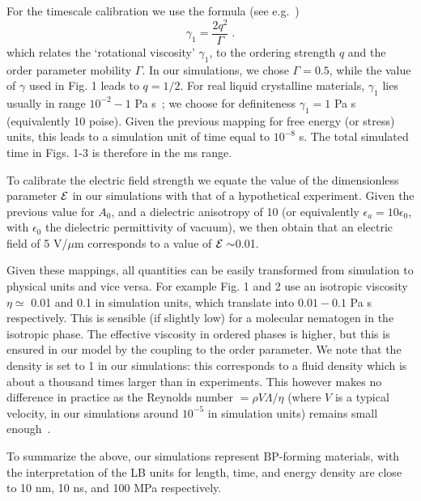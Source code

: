 \documentclass[12pt,twoside]{article}
\begin{document}
For the timescale calibration we use the formula (see e.g.~\cite{denniston1})
\begin{equation}
\gamma_1=\frac{2q^2}{\Gamma}\;.
\end{equation}
 which relates the `rotational viscosity' $\gamma_1$, to the ordering strength $q$ and the order parameter mobility $\Gamma$.
In our simulations, we chose $\Gamma = 0.5$, while the value of $\gamma$ used in Fig. 1 leads to $q=1/2$.   
For real liquid crystalline materials, $\gamma_1$ lies usually in range $10^{-2}-1$ Pa s~\cite{deGennes}; we choose for definiteness $\gamma_1 = 1$ Pa s (equivalently 10 poise). Given the previous mapping for free energy (or stress) units, this leads to a simulation unit of time equal to $10^{-8}$ s. The total simulated time in Figs. 1-3 is therefore in the ms range. 

To calibrate the electric field strength 
we equate the value of the dimensionless parameter ${\cal E}$ in our 
simulations with that of a hypothetical experiment.
Given the previous value for $A_0$, and a dielectric anisotropy of 10
(or equivalently $\epsilon_a=10\epsilon_0$, with $\epsilon_0$ the
dielectric permittivity of vacuum), we then obtain that an electric field
of 5 V/$\mu$m corresponds to a value of ${\cal E}\sim$0.01. 

Given these mappings, all quantities can be easily transformed from
simulation to physical units and vice versa. For example Fig. 1 and 2
use an isotropic viscosity $\eta \simeq$ 0.01 and 0.1 in simulation units,
which translate into $0.01-0.1$ Pa s respectively. This is sensible (if 
slightly low) for a molecular nematogen in the isotropic phase. 
The effective viscosity in ordered phases is higher, but this is ensured
in our model by the coupling to the order parameter.
We note that the density is set to 1 in our simulations: this
corresponds to a fluid density which is about a thousand times larger
than in experiments. This however makes no difference in practice as
the Reynolds number $= \rho V\Lambda/\eta$ (where $V$ is a typical
velocity, in our simulations around $10^{-5}$ in simulation units) 
remains small enough~\cite{codef}. 

To summarize the above, our simulations represent BP-forming materials, with the interpretation of the LB units for length, time, and energy density are close to 10 nm, 10 ns, and 100 MPa respectively.


\end{document}
